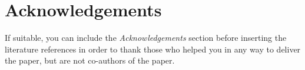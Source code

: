 \documentclass[10pt, a4paper]{article}
\begin{document}

\section*{Acknowledgements}

If suitable, you can include the \emph{Acknowledgements} section before inserting the literature references  in order to thank those who helped you in any way to deliver the paper, but are not co-authors of the paper.




\end{document}
